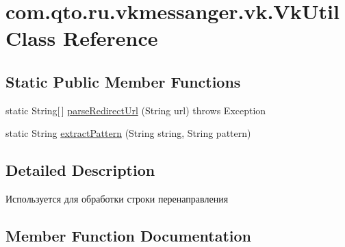 \hypertarget{classcom_1_1qto_1_1ru_1_1vkmessanger_1_1vk_1_1_vk_util}{}\section{com.\+qto.\+ru.\+vkmessanger.\+vk.\+Vk\+Util Class Reference}
\label{classcom_1_1qto_1_1ru_1_1vkmessanger_1_1vk_1_1_vk_util}
\subsection*{Static Public Member Functions}
\begin{DoxyCompactItemize}
\item 
static String\mbox{[}$\,$\mbox{]} \hyperlink{classcom_1_1qto_1_1ru_1_1vkmessanger_1_1vk_1_1_vk_util_a0e5bae7dff47ebac83da0e16472af043}{parse\+Redirect\+Url} (String url)  throws Exception 
\item 
static String \hyperlink{classcom_1_1qto_1_1ru_1_1vkmessanger_1_1vk_1_1_vk_util_a5365f7bd45195e732dba2c8fbc3bce00}{extract\+Pattern} (String string, String pattern)
\end{DoxyCompactItemize}


\subsection{Detailed Description}
Используется для обработки строки перенаправления 

\subsection{Member Function Documentation}
\hypertarget{classcom_1_1qto_1_1ru_1_1vkmessanger_1_1vk_1_1_vk_util_a5365f7bd45195e732dba2c8fbc3bce00}{}
